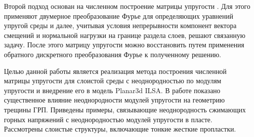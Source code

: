 Второй подход основан на численном построение матрицы упругости \cite{Siebrits_Peirce_2002,Peirce2001TheSF,Peirce2001UniformAA,Linkov1992}. Для этого применяют двумерное преобразование Фурье для определяющих уравнений упругой среды и далее, учитывая условия непрерывности компонент вектора смещений и нормальной нагрузки на границе раздела слоев, решают связанную задачу. После этого матрицу упругости можно восстановить путем применения обратного дискретного преобразования Фурье к полученному решению.

Целью данной работы является реализация метода построения численной матрицы упругости для слоистой среды с неоднородностью по модулям упругости и внедрение его в модель Planar3d ILSA. В работе показано существенное влияние неоднородности модулей упругости на геометрию трещины ГРП. Приведены примеры, связывающие неоднородность сжимающих горных напряжений с неоднородностью модулей упругости в пласте. Рассмотрены слоистые структуры, включающие тонкие жесткие пропластки.


\clearpage